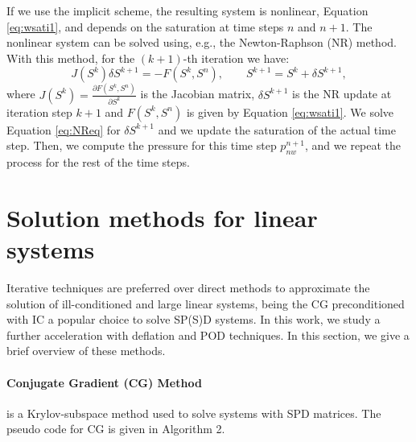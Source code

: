 \documentclass[times,final]{elsarticle}
\begin{document}
 If we use the implicit scheme, the resulting system is nonlinear, Equation \eqref{eq:wsati1}, and depends on the saturation at time steps $n$ and $n+1$. The nonlinear system can be solved using, e.g., the Newton-Raphson (NR) method. With this method, for the $(k+1)$-th iteration we have:
 \begin{equation}\label{eq:NReq}
 {J}({S}^k)\delta{S}^{k+1}=-{F}({S}^k,{S}^n),
\qquad {S}^{k+1}={S}^k+\delta {S}^{k+1},
 \end{equation}
where ${J}({S}^k)=\frac{\partial {F}({S}^k,{S}^n)}{\partial {S}^k}$ is the 
Jacobian matrix, $\delta {S}^{k+1}$ is the NR update at iteration step $k+1$ and ${F}({S}^k,{S}^n)$ is given by Equation \ref{eq:wsati1}. We solve Equation \ref{eq:NReq} for $\delta {S}^{k+1}$ and we update the saturation of the actual time step.
Then, we compute the pressure for this time step $p^{n+1}_{nw}$, and we repeat the process for the rest of the time steps.  \par




\section{Solution methods for linear systems}\label{sec:3}
\hspace{0.5cm}Iterative techniques are preferred over direct methods to approximate the solution of ill-conditioned and large linear systems, being the CG preconditioned with IC a popular choice to solve SP(S)D systems. 
 In this work, we study a further acceleration with deflation and POD techniques. In this section, we give a brief overview of these methods. 
\paragraph{Conjugate Gradient (CG) Method} is a Krylov-subspace method used to solve systems with SPD matrices. 
 The pseudo code for CG is given in Algorithm 2.\par
 
\end{document}
